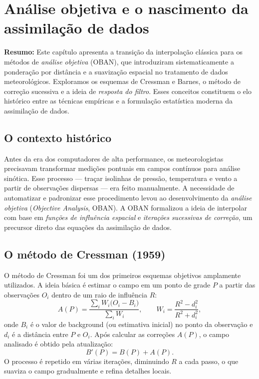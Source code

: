 \chapter{Análise objetiva e o nascimento da assimilação de dados}
\label{ch:obana}

\noindent\textbf{Resumo:}
Este capítulo apresenta a transição da interpolação clássica para os métodos de \emph{análise objetiva} (OBAN), que introduziram sistematicamente a ponderação por distância e a suavização espacial no tratamento de dados meteorológicos.  
Exploramos os esquemas de Cressman e Barnes, o método de correção sucessiva e a ideia de \emph{resposta do filtro}.  
Esses conceitos constituem o elo histórico entre as técnicas empíricas e a formulação estatística moderna da assimilação de dados.

\section{O contexto histórico}
Antes da era dos computadores de alta performance, os meteorologistas precisavam transformar medições pontuais em campos contínuos para análise sinótica.  
Esse processo — traçar isolinhas de pressão, temperatura e vento a partir de observações dispersas — era feito manualmente.  
A necessidade de automatizar e padronizar esse procedimento levou ao desenvolvimento da \emph{análise objetiva} (\emph{Objective Analysis}, OBAN).  
A OBAN formalizou a ideia de interpolar com base em \emph{funções de influência espacial} e \emph{iterações sucessivas de correção}, um precursor direto das equações da assimilação de dados.

\section{O método de Cressman (1959)}
O método de Cressman foi um dos primeiros esquemas objetivos amplamente utilizados.  
A ideia básica é estimar o campo em um ponto de grade $P$ a partir das observações $O_i$ dentro de um raio de influência $R$:
\begin{equation}
A(P) = \frac{\displaystyle \sum_i W_i \big(O_i - B_i\big)}{\displaystyle \sum_i W_i},
\qquad
W_i = \frac{R^2 - d_i^2}{R^2 + d_i^2},
\label{eq:cressman}
\end{equation}
onde $B_i$ é o valor de background (ou estimativa inicial) no ponto da observação e $d_i$ é a distância entre $P$ e $O_i$.  
Após calcular as correções $A(P)$, o campo analisado é obtido pela atualização:
\begin{equation}
B'(P) = B(P) + A(P).
\label{eq:update}
\end{equation}
O processo é repetido em várias iterações, diminuindo $R$ a cada passo, o que suaviza o campo gradualmente e refina detalhes locais.

